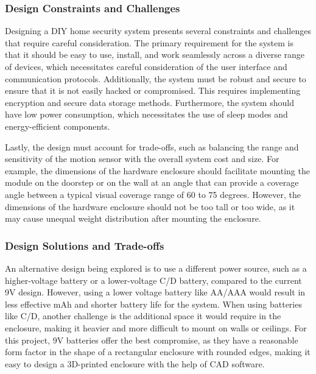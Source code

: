 \documentclass[conference]{IEEEtran}
\begin{document}
\subsubsection{Design Constraints and Challenges}

Designing a DIY home security system presents several constraints and challenges that
require careful consideration. The primary requirement for the system is that it should
be easy to use, install, and work seamlessly across a diverse range of devices, which
necessitates careful consideration of the user interface and communication protocols.
Additionally, the system must be robust and secure to ensure that it is not easily
hacked or compromised. This requires implementing encryption and secure data storage
methods. Furthermore, the system should have low power consumption, which necessitates
the use of sleep modes and energy-efficient components.

Lastly, the design must account for trade-offs, such as balancing the range and
sensitivity of the motion sensor with the overall system cost and size. For example,
the dimensions of the hardware enclosure should facilitate mounting the module on the
doorstep or on the wall at an angle that can provide a coverage angle between a
typical visual coverage range of 60 to 75 degrees. However, the dimensions of the
hardware enclosure should not be too tall or too wide, as it may cause unequal weight
distribution after mounting the enclosure.

\subsubsection{Design Solutions and Trade-offs}

An alternative design being explored is to use a different power source,
such as a higher-voltage battery or a lower-voltage C/D battery, compared to the
current 9V design. However, using a lower voltage battery like AA/AAA would result
in less effective mAh and shorter battery life for the system. When using batteries
like C/D, another challenge is the additional space it would require in the enclosure,
making it heavier and more difficult to mount on walls or ceilings. For this project,
9V batteries offer the best compromise, as they have a reasonable form factor in the
shape of a rectangular enclosure with rounded edges, making it easy to design a
3D-printed enclosure with the help of CAD software.
\end{document}
